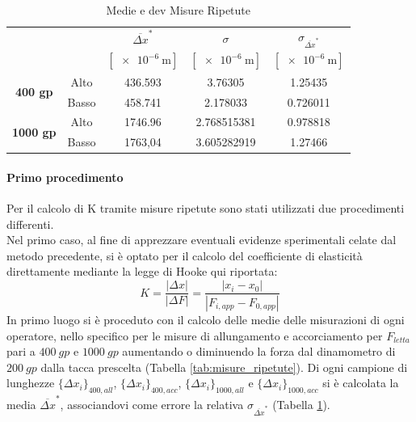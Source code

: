 \documentclass[a4paper,11pt,oneside]{article}
\begin{document}
\begin{table}[h!]
    \centering
    \begin{tabular}{|c|c|c|c|c|}
        \hline
          \multicolumn{2}{|c|}{\multirow{2}{*}{}} & ${\overline{\Delta x}}^\ast$& $\sigma$ & $\sigma_{{\overline{\Delta x}}^\ast}$\\
          \multicolumn{2}{|c|}{} & $[\SI{e-6}{\meter}]$ & $[\SI{e-6}{\meter}]$ & $[\SI{e-6}{\meter}]$\\ 
          \hline
          \multirow{2}{*}{\textbf{400 gp}}& {\cellcolor[rgb]{0.85,0.85,0.85}}Alto & {\cellcolor[rgb]{0.85,0.85,0.85}}436.593&	{\cellcolor[rgb]{0.85,0.85,0.85}}3.76305&	{\cellcolor[rgb]{0.85,0.85,0.85}}1.25435\\ \cline{2-5}
          &Basso&   458.741&	2.178033&	0.726011\\
          \hline
          \multirow{2}{*}{\textbf{1000 gp}}& {\cellcolor[rgb]{0.85,0.85,0.85}}Alto & {\cellcolor[rgb]{0.85,0.85,0.85}}1746.96&	{\cellcolor[rgb]{0.85,0.85,0.85}}2.768515381&	{\cellcolor[rgb]{0.85,0.85,0.85}}0.978818\\ \cline{2-5}
          &Basso&   1763,04&	3.605282919&	1.27466\\
         \hline
    \end{tabular}
    \caption{Medie e dev Misure Ripetute}
    \label{tab:medie_misure_ripetute}
\end{table}{}
\paragraph{Primo procedimento}
Per il calcolo di K tramite misure ripetute sono stati utilizzati due procedimenti differenti.\\
Nel primo caso, al fine di apprezzare eventuali evidenze sperimentali celate dal metodo precedente, si è optato per il calcolo del coefficiente di elasticità direttamente mediante la legge di Hooke qui riportata:\\%
\begin{equation*}
    K=\frac{\left | \Delta x \right |}{\left | \Delta F \right |}=\frac{\left | x_{i}-x_{0} \right |}{\left | F_{i, app}- F_{0, app} \right |}
\end{equation*}
In primo luogo si è proceduto con il calcolo delle medie delle misurazioni di ogni operatore, nello specifico per le misure di allungamento e accorciamento per $F_{letta}$ pari a $\SI{400}{gp}$ e $\SI{1000}{gp}$ aumentando o diminuendo la forza dal dinamometro di $\SI{200}{gp}$ dalla tacca prescelta (Tabella \ref{tab:misure_ripetute}). Di ogni campione di lunghezze $\{ {\Delta x}_i \}_{400, all}$, $\{ {\Delta x}_i \}_{400, acc}$, $\{ {\Delta x}_i \}_{1000, all}$ e $\{ {\Delta x}_i \}_{1000, acc}$ si è calcolata la media ${\overline{\Delta x}}^\ast$, associandovi come errore la relativa $\sigma_{\overline{\Delta x}^\ast}$ (Tabella \ref{tab:medie_misure_ripetute}).\\
\end{document}

